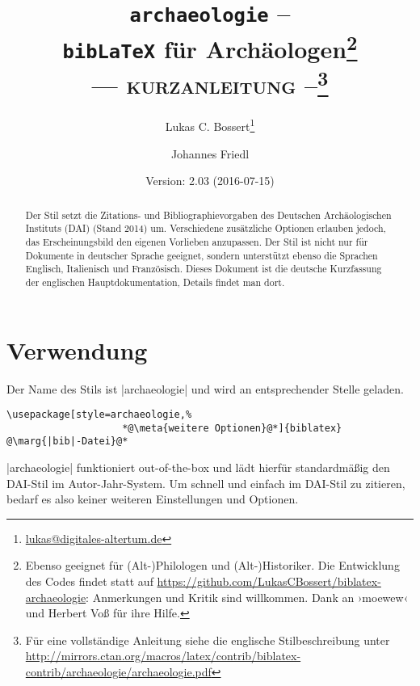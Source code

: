\documentclass[a4paper,10pt,ngerman]{ltxdoc}
\def\archaeologieversion{2.03}
\def\archaeologiedate{2016-07-15}
\begin{document}
 \title{\texttt{archaeologie} -- \\\texttt{bib\LaTeX} für Archäologen\footnote{Ebenso geeignet für (Alt-)Philologen und (Alt-)Historiker.
 Die Entwicklung des Codes findet statt auf \url{https://github.com/LukasCBossert/biblatex-archaeologie}: 
 Anmerkungen und Kritik sind willkommen.
 Dank an   ›moewew‹ und Herbert Voß für ihre Hilfe.
}\\ --- {\scshape kurzanleitung} --\footnote{Für eine vollständige Anleitung siehe die englische Stilbeschreibung unter \url{http://mirrors.ctan.org/macros/latex/contrib/biblatex-contrib/archaeologie/archaeologie.pdf}} }
\author{Lukas C. Bossert\thanks{\url{lukas@digitales-altertum.de}} \and Johannes Friedl}
\date{Version: \archaeologieversion{} (\archaeologiedate)} 
 
 \maketitle
 \begin{abstract}
\noindent Der Stil setzt die Zitations- und Bibliographievorgaben des Deutschen Archäologischen Instituts (DAI) (Stand 2014) um. Verschiedene zusätzliche Optionen erlauben jedoch, das Erscheinungsbild den eigenen Vorlieben anzupassen. Der Stil ist nicht nur für Dokumente in deutscher Sprache geeignet, sondern unterstützt ebenso die Sprachen Englisch, Italienisch und Französisch. Dieses Dokument ist die deutsche Kurzfassung der englischen Hauptdokumentation, Details findet man dort.

 \end{abstract}

	{\parskip=0mm \tableofcontents}
\section{Verwendung}
   Der Name des Stils ist |archaeologie| und wird an entsprechender Stelle geladen.

\begin{lstlisting}
\usepackage[style=archaeologie,%
					*@\meta{weitere Optionen}@*]{biblatex}
@\marg{|bib|-Datei}@*
\end{lstlisting}

|archaeologie| funktioniert out-of-the-box und lädt hierfür standardmäßig den DAI-Stil im Autor-Jahr-System. 
Um schnell und einfach im DAI-Stil zu zitieren, bedarf es also keiner weiteren Einstellungen und Optionen. 
\end{document}

